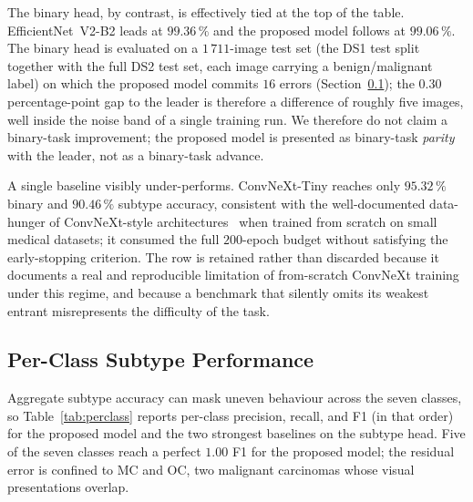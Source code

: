 The binary head, by contrast, is effectively tied at the top of the table.
EfficientNet~V2-B2 leads at $99.36\,\%$ and the proposed model follows at
$99.06\,\%$. The binary head is evaluated on a $1\,711$-image test set (the
DS1 test split together with the full DS2 test set, each image carrying a
benign/malignant label) on which the proposed model commits $16$ errors
(Section~\ref{subsec:perclass});
the $0.30$ percentage-point gap to the leader is therefore a difference of
roughly five images, well inside the noise band of a single training run. We
therefore do not claim a binary-task improvement; the proposed model is
presented as binary-task \emph{parity} with the leader, not as a binary-task
advance.

A single baseline visibly under-performs. ConvNeXt-Tiny reaches only
$95.32\,\%$ binary and $90.46\,\%$ subtype accuracy, consistent with the
well-documented data-hunger of ConvNeXt-style architectures~\cite{liu2022convnext}
when trained from scratch on small medical datasets; it consumed the full
$200$-epoch budget without satisfying the early-stopping criterion. The row is
retained rather than discarded because it documents a real and reproducible
limitation of from-scratch ConvNeXt training under this regime, and because a
benchmark that silently omits its weakest entrant misrepresents the difficulty
of the task.

\subsection{Per-Class Subtype Performance}\label{subsec:perclass}

Aggregate subtype accuracy can mask uneven behaviour across the seven classes,
so Table~\ref{tab:perclass} reports per-class precision, recall, and F1 (in
that order) for the proposed model and the two strongest baselines on the
subtype head. Five of the seven classes reach a perfect $1.00$ F1 for the
proposed model; the residual error is confined to MC and OC, two malignant
carcinomas whose visual presentations overlap.

